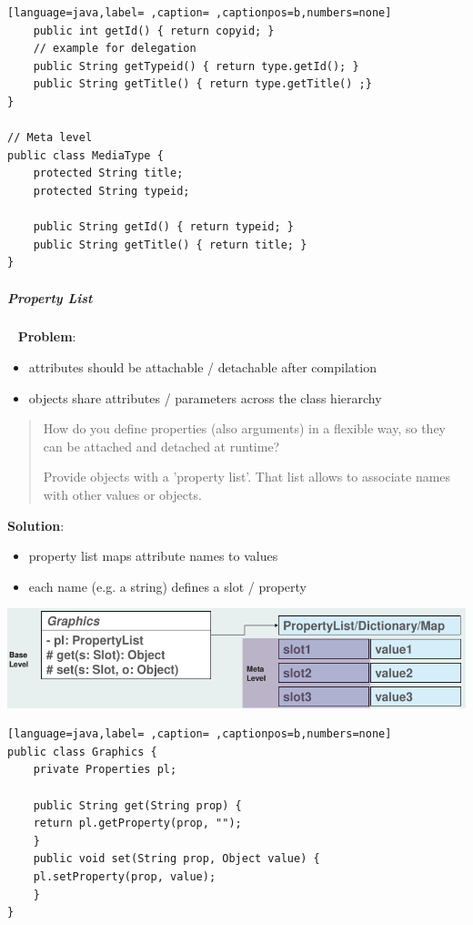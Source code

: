 \documentclass[11pt,twoside,landscape]{article}
\begin{document}
\begin{multicols}{3}
\begin{lstlisting}[language=java,label= ,caption= ,captionpos=b,numbers=none]
    public int getId() { return copyid; }
    // example for delegation
    public String getTypeid() { return type.getId(); }
    public String getTitle() { return type.getTitle() ;}
}

// Meta level
public class MediaType {
    protected String title;
    protected String typeid;

    public String getId() { return typeid; }
    public String getTitle() { return title; }
}
\end{lstlisting}
\subparagraph{Property List} \
\label{sec:orgafd881a}
\textbf{Problem}:
\begin{itemize}
\item attributes should be attachable / detachable after compilation
\item objects share attributes / parameters across the class hierarchy
\end{itemize}


\begin{quote}
How do you define properties (also arguments) in a flexible way, so they can be attached and detached at runtime?

Provide objects with a 'property list'. That list allows to associate names with other values or objects.
\end{quote}


\textbf{Solution}:
\begin{itemize}
\item property list maps attribute names to values
\item each name (e.g. a string) defines a slot / property
\end{itemize}

{
\begin{center}
\includegraphics[width=.9\linewidth]{img/property_list_example.png}
\end{center}
\label{fig:property-list-example}
}

\begin{lstlisting}[language=java,label= ,caption= ,captionpos=b,numbers=none]
public class Graphics {
    private Properties pl;

    public String get(String prop) {
	return pl.getProperty(prop, "");
    }
    public void set(String prop, Object value) {
	pl.setProperty(prop, value);
    }
}


\end{lstlisting}
\end{multicols}
\end{document}
